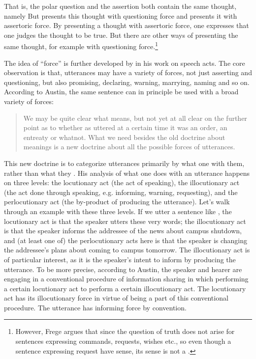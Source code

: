 That is, the polar question  and the assertion  both contain the same thought, namely   But  presents this thought with questioning force and  presents it with assertoric force. By presenting a thought with assertoric force, one expresses that one judges the thought to be true. But there are other ways of presenting the same thought, for example with questioning force.\footnote{However, Frege argues that since the question of truth does not arise for sentences expressing commands, requests, wishes etc., so even though a sentence expressing request have sense, its sense is not a .}

The idea of ``force'' is further developed by \textcite{austin1975things} in his work on speech acts. The core observation is that, utterances may have a variety of forces, not just asserting and questioning, but also promising, declaring, warning, marrying, naming and so on. According to Austin, the same sentence can in principle be used with a broad variety of forces:

\begin{quote}
    
We may be quite clear what  means, but not yet at all clear on the further point as to whether as uttered at a certain time it was an order, an entreaty or whatnot. What we need besides the old doctrine about meanings is a new doctrine about all the possible forces of utterances.

\hfill \cite[251]{austin1975things}
\end{quote}

This new doctrine is to categorize utterances primarily by what one  with them, rather than what they . His analysis of what one does with an utterance happens on three levels: the locutionary act (the act of speaking), the illocutionary act (the act done through speaking, e.g. informing, warning, requesting), and the perlocutionary act (the by-product of producing the utterance). Let’s walk through an example with these three levels. If we utter a sentence like , the locutionary act is that the speaker utters these very words; the illocutionary act is that the speaker informs the addressee of the news about campus shutdown, and (at least one of) the perlocutionary acts here is that the speaker is changing the addressee’s plans about coming to campus tomorrow. The illocutionary act is of particular interest, as it is the speaker’s intent to inform by producing the utterance. To be more precise, according to Austin, the speaker and hearer are engaging in a conventional procedure of information sharing in which performing a certain locutionary act  to perform a certain illocutionary act. The locutionary act has its illocutionary force in virtue of being a part of this conventional procedure. The utterance has informing force by convention.


